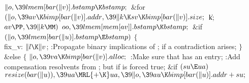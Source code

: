 ${}\|o,\39\\{lmem}[\\{bar}(\|v)].\\{bstamp}\K\\{bstamp};{}$\6
\&{for} ${}(\|o,\39\\{av}\K\\{bimp}[\\{bar}(\|v)].\\{addr},\39\|k\K\\{sv}\K%
\\{bimp}[\\{bar}(\|v)].\\{size};{}$ \|k; ${}\\{av}\PP,\39\|k\MM){}$\1\5
${}\\{oo},\39\\{lmem}[\\{mem}[\\{av}]].\\{bstamp}\K\\{bstamp};{}$\2\6
\&{if} ${}(\|o,\39\\{lmem}[\\{bar}(\|u)].\\{bstamp}\E\\{bstamp}){}$\5
${}\{{}$\1\6
\4\\{fix\_v}:\5
${}\|l\K\|v{}$;\5
:Propagate binary implications of ;  if a
contradiction arises\X;\6
\4${}\}{}$\5
\2\&{else}\5
${}\{{}$\1\6
${}\|o,\39\\{va}\K\\{bimp}[\\{bar}(\|v)].\\{alloc};{}$\6
:Make sure that  has an  entry\X;\6
:Add compensation resolvents from ; but  if  is forced true\X;\6
\&{if} ${}(\\{su}\E\\{ua}){}$\1\5
${}\\{resize}(\\{bar}(\|u)),\39\\{ua}\MRL{+{\K}}\\{ua},\39\|o,\39\\{au}\K%
\\{bimp}[\\{bar}(\|u)].\\{addr}+\\{su};{}$\2\6
